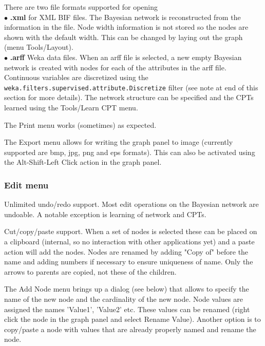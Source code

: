 \documentclass[a4paper]{article}
\begin{document}
There are two file formats supported for opening\\
$\bullet$ {\bf .xml} for XML BIF files. The Bayesian network is reconstructed
from the information in the file. Node width information is not stored so the nodes
are shown with the default width. This can be changed by laying out the graph
(menu Tools/Layout).\\
$\bullet$ {\bf .arff} Weka data files. When an arff file is selected, a new
empty Bayesian network is created with nodes for each of the attributes
in the arff file. Continuous variables are discretized using the 
{\tt weka.filters.supervised.attribute.Discretize} filter (see note at end of
this section for more details). The network
structure can be specified and the CPTs learned using the Tools/Learn CPT
menu.

The Print menu works (sometimes) as expected.

The Export menu allows for writing the graph panel to image (currently
supported are bmp, jpg, png and eps formats). This can also be activated
using the Alt-Shift-Left Click action in the graph panel.

\subsubsection*{Edit menu}

\begin{center}
\end{center}

Unlimited undo/redo support. Most edit operations on the Bayesian network
are undoable. A notable exception is learning of network and CPTs.

Cut/copy/paste support. When a set of nodes is selected these can be placed on
a clipboard (internal, so no interaction with other applications yet) and
a paste action will add the nodes. Nodes are renamed by adding "Copy of" before
the name and adding numbers if necessary to ensure uniqueness of name.
Only the arrows to parents are copied, not these of the children.

The Add Node menu brings up a dialog (see below) that allows to specify the name of the
new node and the cardinality of the new node. Node values are assigned the
names 'Value1', 'Value2' etc. These values can be renamed (right click the node
in the graph panel and select Rename Value). Another option is to copy/paste
a node with values that are already properly named and rename the node.
\end{document}
